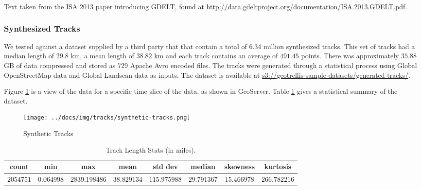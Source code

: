 Text taken from the ISA 2013 paper introducing GDELT, found at \url{http://data.gdeltproject.org/documentation/ISA.2013.GDELT.pdf}.


\subsubsection{Synthesized Tracks}
\label{sec:performance:datasets:synthesized}

We tested against a dataset supplied by a third party that that contain a total of $6.34$ million synthesized tracks.
This set of tracks had a median length of $29.8$ km, a mean length of $38.82$ km and each track contains an average of $491.45$ points.
There was approximately $35.88$ GB of data compressed and stored as $729$ Apache Avro encoded files.
The tracks were generated through a statistical process using Global OpenStreetMap data and Global Landscan data as inputs.
The dataset is available at \url{s3://geotrellis-sample-datasets/generated-tracks/}.

Figure \ref{geoserver} is a view of the data for a specific time slice of the data, as shown in GeoServer.
Table \ref{table:lengths} gives a statistical summary of the dataset.

\begin{figure}[h!tb]
  \centering
  \texttt{[image: ../docs/img/tracks/synthetic-tracks.png]}
  \caption{Synthetic Tracks}
  \label{geoserver}
\end{figure}

\begin{table}[h!tb]
  \centering
  \begin{tabular}{ | c | c | c | c | c | c | c | c | }
    \hline
    count & min & max & mean & std dev & median & skewness & kurtosis \\ \hline
    $2054751$ & $0.064998$ & $2839.198486$ & $38.829134$ & $115.975988$ & $29.791367$ & $15.466978$ & $266.782216$ \\
    \hline
  \end{tabular}
  \caption{Track Length Stats (in miles).}
  \label{table:lengths}
\end{table}
